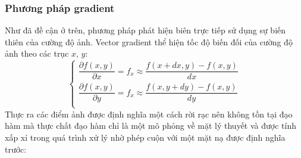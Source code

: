 \documentclass[12pt, oneside, a4paper]{book}
\begin{document}
\subsubsection{Phương pháp gradient}
Như đã đề cận ở trên, phương pháp phát hiện biên trực tiếp sử dụng sự biến thiên của cường độ ảnh. Vector gradient thể hiện tốc độ biến đối của cường độ ảnh theo các trục  $x,\, y$:
\begin{equation*}
\begin{cases}
 \dfrac{\partial f(x,y)}{\partial x}=f_x\approx\dfrac{f(x+dx,y)-f(x,y)}{dx}\\
 \dfrac{\partial f(x,y)}{\partial y}=f_x\approx\dfrac{f(x,y+dy)-f(x,y)}{dy}\\
   \end{cases}
\end{equation*}
Thực ra các điểm ảnh được định nghĩa một cách rời rạc nên không tồn tại đạo hàm mà thực chất đạo hàm chỉ là một mô phỏng về mặt lý thuyết và được tính xấp xỉ trong quá trình xử lý nhờ phép cuộn với một mặt nạ được định nghĩa trước:
\end{document}
